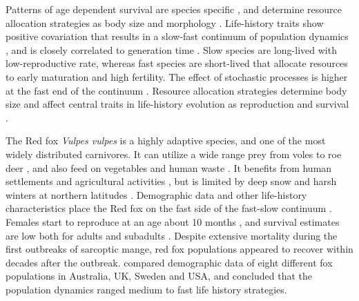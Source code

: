 \documentclass[12pt,a4paper,final,abstract=true,headings=small]{scrartcl}
\begin{document}
Patterns of age dependent survival are species specific  \citep{martinPatternsMechanismsAgeDependent1995,loison1999age}, and determine resource allocation strategies as body size and morphology \citep{roffPredictingBodySize1986,siblyEffectsBodySize2007,brooksHowWellCan2016}. Life-history traits show positive covariation that results in a slow-fast continuum of population dynamics \citep{oliFastSlowContinuum2004}, and is closely correlated to generation time \citep{krausLivingSlowDying2005}. Slow species are long-lived with low-reproductive rate, whereas fast species are short-lived that allocate resources to early maturation and high fertility. The effect of stochastic processes is higher at the fast end of the continuum \citep{saetherHowLifeHistory2013}. Resource allocation strategies determine body size and affect central traits  in life-history evolution as reproduction and survival \citep{roffPredictingBodySize1986,siblyEffectsBodySize2007,brooksHowWellCan2016}.

The Red fox \emph{Vulpes vulpes} is a highly adaptive species, and one of the most widely distributed carnivores. It can utilize a wide range prey from voles to roe deer \citep{englundAspectsReproductionMortality1970,kjellanderCyclicVolesPrey2003}, and also feed on vegetables and human waste \citep{carvalhoFoodHabitsTrophic2001}. It benefits from human settlements and agricultural activities \citep{jahrenImpactHumanLand2020,gallantDisentanglingRelativeInfluences2020,vuorisaloUrbanRedFoxes2014}, but is limited by deep snow and harsh winters at northern latitudes \citep{bartonWinterSeverityLimits2007,frafjordRedFoxNorway1998}. Demographic data and other life-history characteristics place the Red fox on the fast side of the fast-slow continuum \citep{heppellLifeHistoriesElasticity2000}. Females start to reproduce at an age about 10 months \citep{englundAspectsReproductionMortality1970}, and survival estimates are low both for adults and subadults \citep{devenish-nelsonDemographyCarnivoreRed2013, willebrandDecliningSurvivalRates2022}. Despite extensive mortality during the first outbreaks of sarcoptic mange, red fox populations appeared to recover within decades after the outbreak\citep{soulsburyImpactSarcopticMange2007,willebrandDecliningSurvivalRates2022}. \citet{devenish-nelsonDemographyCarnivoreRed2013} compared demographic data of eight different fox populations in Australia, UK, Sweden and USA, and concluded that the population dynamics ranged medium to fast life history strategies.
\end{document}
